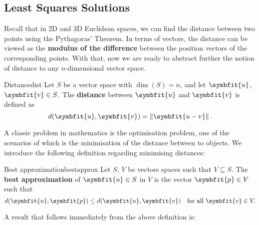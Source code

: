 \documentclass[math]{amznotes}
\theoremstyle{remark}
\begin{document}
\subsection{Least Squares Solutions}
Recall that in 2D and 3D Euclidean spaces, we can find the distance between two points using the Pythagoras' Theorem. In terms of vectors, the distance can be viewed as the {\color{red} \textbf{modulus of the difference}} between the position vectors of the corresponding points. With that, now we are ready to abstract further the notion of distance to any $n$-dimensional vector space.
\begin{dfnbox}{Distance}{dist}
    Let $S$ be a vector space with $\dim(S) = n$, and let $\symbfit{u}$, $\symbfit{v} \in S$. The {\color{red} \textbf{distance}} between $\symbfit{u}$ and $\symbfit{v}$ is defined as
    \begin{equation*}
        d(\symbfit{u}, \symbfit{v}) = \left\lVert \symbfit{u - v} \right\rVert.
    \end{equation*}
\end{dfnbox}
A classic problem in mathematics is the optimisation problem, one of the scenarios of which is the minimisation of the distance between to objects. We introduce the following definition regarding minimising distances:
\begin{dfnbox}{Best approximation}{bestapprox}
    Let $S$, $V$ be vectors spaces such that $V \subseteq S$. The {\color{red} \textbf{best approximation}} of $\symbfit{u} \in S$ in $V$ is the vector $\symbfit{p} \in V$ such that
    \begin{displaymath}
        d(\symbfit{u}, \symbfit{p}) \leq d(\symbfit{u}, \symbfit{v}) \quad \textrm{for all } \symbfit{v} \in V.
    \end{displaymath}
\end{dfnbox}
A result that follows immediately from the above definition is:
\end{document}
